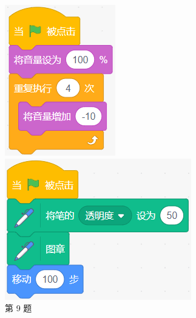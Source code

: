 \documentclass[10pt, a4paper]{article}
\begin{document}
\begin{enumerate}
\begin{figure}[htbp]
\begin{minipage}[t]{.168\textwidth}
                \includegraphics[width=\textwidth]{figure/9.png}
                \caption*{第 9 题}
            \end{minipage}
            \begin{minipage}[t]{.26\textwidth}
                \centering
                \includegraphics[width=\textwidth]{figure/11.png}

\end{minipage}
\end{figure}
\end{enumerate}
\end{document}
